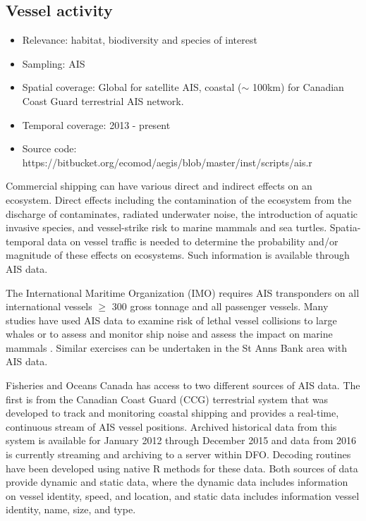 \documentclass[letterpaper,portrait,11pt]{scrartcl}
\numberwithin{equation}{section}    %
\numberwithin{figure}{section}    %
\numberwithin{table}{section}       %
\begin{document}
\afterpage{\clearpage}
\subsection{Vessel activity}

\begin{itemize}
	\item Relevance:  habitat, biodiversity and species of interest
	\item Sampling:  AIS
	\item Spatial coverage: Global for satellite AIS, coastal ($\sim$ 100km) for Canadian Coast Guard terrestrial AIS network.
	\item Temporal coverage: 2013 - present
	\item Source code: https://bitbucket.org/ecomod/aegis/blob/master/inst/scripts/ais.r
\end{itemize}	


Commercial shipping can have various direct and indirect effects on an ecosystem. Direct effects including the contamination of the ecosystem from the discharge of contaminates, radiated underwater noise, the introduction of aquatic invasive species, and vessel-strike risk to marine mammals and sea turtles. Spatia-temporal data on vessel traffic is needed to determine the probability and/or magnitude of these effects on ecosystems. Such information is available through AIS data.  

The International Maritime Organization (IMO) requires AIS transponders on all international vessels $\geq$ 300 gross tonnage and all passenger vessels.  Many studies have used AIS data to examine risk of lethal vessel collisions to large whales \parencite[e.g.,][ ]{vanderlaan:2009:efficacy, wiley:2011:modeling, redfern2013assessing, guzman2013potential} or to assess and monitor ship noise and assess the impact on marine mammals \parencite{ hatch2008characterizing, mckenna2012underwater, hatch2012quantifying, merchant2014monitoring}. Similar exercises can be undertaken in the St Anns Bank area with AIS data.

Fisheries and Oceans Canada has access to two different sources of AIS data.  The first is from the Canadian Coast Guard (CCG) terrestrial system that was developed to track and monitoring coastal shipping and provides a real-time, continuous stream of AIS vessel positions.  Archived historical data from this system is available for January 2012 through December 2015 and data from 2016 is currently streaming and archiving to a server within DFO. Decoding routines have been developed using native R methods for these data.   Both sources of data provide dynamic and static data, where the dynamic data includes information on vessel identity, speed, and location, and static data includes information vessel identity, name, size, and type.   
\end{document}
